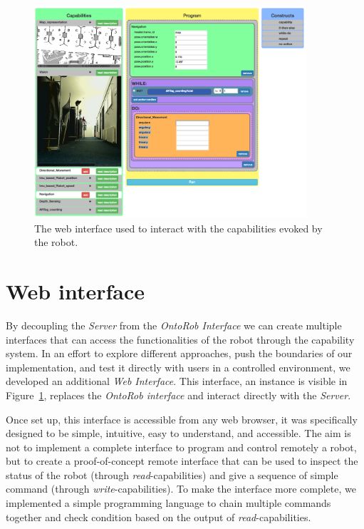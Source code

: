 \begin{figure}[t]
    \centering
    \includegraphics[width=0.9\textwidth]{gfx/onto/web}
    \caption{The web interface used to interact with the capabilities evoked by the robot.}\label{fig:web-api}
\end{figure}

\section{Web interface}
By decoupling the \textit{Server} from the \textit{OntoRob Interface} we can create multiple interfaces that can access the functionalities of the robot through the capability system. In an effort to explore different approaches, push the boundaries of our implementation, and test it directly with users in a controlled environment, we developed an additional \textit{Web Interface}. This interface, an instance is visible in Figure~\ref{fig:web-api}, replaces the \textit{OntoRob interface} and interact directly with the \textit{Server}.

Once set up, this interface is accessible from any web browser, it was specifically designed to be simple, intuitive, easy to understand, and accessible. The aim is not to implement a complete interface to program and control remotely a robot, but to create a proof-of-concept remote interface that can be used to inspect the status of the robot (through \textit{read}-capabilities) and give a sequence of simple command (through \textit{write}-capabilities). To make the interface more complete, we implemented a simple programming language to chain multiple commands together and check condition based on the output of \textit{read}-capabilities.

